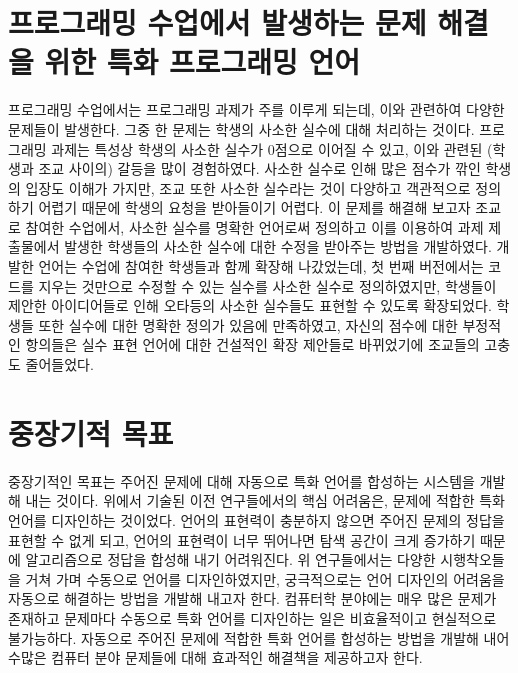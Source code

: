 \documentclass[11pt]{article}
\begin{document}
\begin{spacing}{1.145}
\section{프로그래밍 수업에서 발생하는 문제 해결을 위한 특화 프로그래밍 언어}
\hspace{\parindent}
프로그래밍 수업에서는 프로그래밍 과제가 주를 이루게 되는데, 이와 관련하여 다양한 문제들이 발생한다.
%
그중 한 문제는 학생의 사소한 실수에 대해 처리하는 것이다.
%
프로그래밍 과제는 특성상 학생의 사소한 실수가 0점으로 이어질 수 있고, 이와 관련된 (학생과 조교 사이의) 갈등을 많이 경험하였다.
%
사소한 실수로 인해 많은 점수가 깎인 학생의 입장도 이해가 가지만, 조교 또한 사소한 실수라는 것이 다양하고 객관적으로 정의하기 어렵기 때문에 학생의 요청을 받아들이기 어렵다.
%
이 문제를 해결해 보고자 조교로 참여한 수업에서, 사소한 실수를 명확한 언어로써 정의하고 이를 이용하여 과제 제출물에서 발생한 학생들의 사소한 실수에 대한 수정을 받아주는 방법을 개발하였다.
%
개발한 언어는 수업에 참여한 학생들과 함께 확장해 나갔었는데, 첫 번째 버전에서는 코드를 지우는 것만으로 수정할 수 있는 실수를 사소한 실수로 정의하였지만, 학생들이 제안한 아이디어들로 인해 오타등의 사소한 실수들도 표현할 수 있도록 확장되었다.
%
학생들 또한 실수에 대한 명확한 정의가 있음에 만족하였고, 자신의 점수에 대한 부정적인 항의들은 실수 표현 언어에 대한 건설적인 확장 제안들로 바뀌었기에 조교들의 고충도 줄어들었다.


\section{중장기적 목표}
\hspace{\parindent}
중장기적인 목표는 주어진 문제에 대해 자동으로 특화 언어를 합성하는 시스템을 개발해 내는 것이다.
%
위에서 기술된 이전 연구들에서의 핵심 어려움은, 문제에 적합한 특화 언어를 디자인하는 것이었다.
%
언어의 표현력이 충분하지 않으면 주어진 문제의 정답을 표현할 수 없게 되고, 언어의 표현력이 너무 뛰어나면 탐색 공간이 크게 증가하기 때문에 알고리즘으로 정답을 합성해 내기 어려워진다.
%
위 연구들에서는 다양한 시행착오들을 거쳐 가며 수동으로 언어를 디자인하였지만, 궁극적으로는 언어 디자인의 어려움을 자동으로 해결하는 방법을 개발해 내고자 한다.
%
컴퓨터학 분야에는 매우 많은 문제가 존재하고 문제마다 수동으로 특화 언어를 디자인하는 일은 비효율적이고 현실적으로 불가능하다.
%
자동으로 주어진 문제에 적합한 특화 언어를 합성하는 방법을 개발해 내어 수많은 컴퓨터 분야 문제들에 대해 효과적인 해결책을 제공하고자 한다.









\end{spacing}
\end{document}
